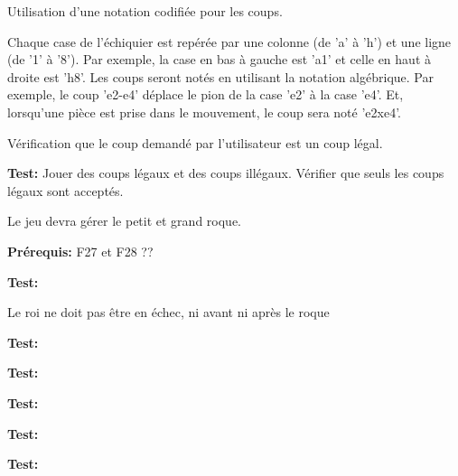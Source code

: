 \documentclass{article}
\begin{document}
\begin{needbox}
    Utilisation d'une notation codifiée pour les coups.
    \begin{subneedbox}
        Chaque case de l'échiquier est repérée par une colonne (de 'a' à 'h') et une ligne (de '1' à '8'). Par exemple, la case en bas à gauche est 'a1' et celle en haut à droite est 'h8'. Les coups seront notés en utilisant la notation algébrique. Par exemple, le coup 'e2-e4' déplace le pion de la case 'e2' à la case 'e4'. Et, lorsqu'une pièce est prise dans le mouvement, le coup sera noté 'e2xe4'.
    \end{subneedbox}
    \begin{subneedbox}
        Vérification que le coup demandé par l'utilisateur est un coup légal.
    \end{subneedbox}
    \textbf{Test:} Jouer des coups légaux et des coups illégaux. Vérifier que seuls les coups légaux sont acceptés.
\end{needbox}

\begin{needbox}[F30. Roque]
    Le jeu devra gérer le petit et grand roque.

    \textbf{Prérequis:} F27 et F28 ??
    \begin{subneedbox}
        

        \textbf{Test:}
    \end{subneedbox}
    \begin{subneedbox}
        Le roi ne doit pas être en échec, ni avant ni après le roque

        \textbf{Test:}
    \end{subneedbox}
    \begin{subneedbox}
        

        \textbf{Test:}
    \end{subneedbox}
    \begin{subneedbox}
        

        \textbf{Test:}
    \end{subneedbox}
    \begin{subneedbox}
        

        \textbf{Test:}
    \end{subneedbox}
    \begin{subneedbox}
        

        \textbf{Test:}
    \end{subneedbox}
\end{needbox}
\end{document}
